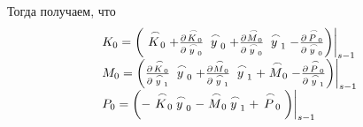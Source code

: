     Тогда получаем, что
    \begin{equation*}
        \begin{matrix*}[l]
            K_0 = \bigg( \LittleCap{K}_0 + \frac{\partial \LittleCap{K}_0}{\partial \LittleCap{y}_0}\LittleCap{y}_0 + \frac{\partial \LittleCap{M}_0}{\partial \LittleCap{y}_0}\LittleCap{y}_1 - \frac{\partial \LittleCap{P}_0}{\partial \LittleCap{y}_0} \bigg)\bigg|_{s-1} \\
            M_0 = \bigg( \frac{\partial \LittleCap{K}_0}{\partial \LittleCap{y}_1}\LittleCap{y}_0 + \frac{\partial \LittleCap{M}_0}{\partial \LittleCap{y}_1}\LittleCap{y}_1 + \LittleCap{M}_0 - \frac{\partial \LittleCap{P}_0}{\partial \LittleCap{y}_1} \bigg)\bigg|_{s-1} \\
            P_0 = \bigg( - \LittleCap{K}_0 \LittleCap{y}_0 - \LittleCap{M}_0 \LittleCap{y}_1 + \LittleCap{P}_0 \bigg) \bigg|_{s-1} \\
        \end{matrix*}
    \end{equation*}

